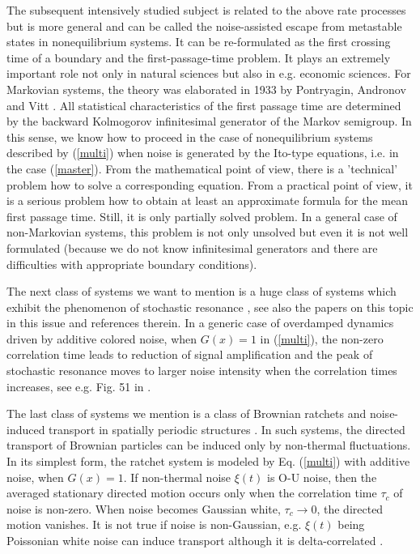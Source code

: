 \documentclass[authoryear,draft,1p,times]{elsarticle}
\renewcommand{\=}{\stackrel{\mathrm{d}}{=}}
\begin{document}
The subsequent intensively studied subject is related to the above rate 
processes  but is more general and can be called the noise-assisted 
escape from metastable states in nonequilibrium systems. It can be 
re-formulated as the first crossing  time of a boundary and 
 the  first-passage-time problem. It plays an extremely important role not 
only in natural sciences but also in  e.g. economic sciences.
  For Markovian systems, 
the theory was elaborated  in 1933 by Pontryagin, Andronov and 
Vitt \cite{pon}. All statistical characteristics of the first passage 
time are determined by the backward Kolmogorov infinitesimal 
generator of the Markov semigroup. In this sense, we know 
how to proceed in the case of nonequilibrium systems described by 
(\ref{multi}) when noise is generated by the Ito-type equations, 
i.e. in the case (\ref{master}). From the mathematical point of view, 
there is a 'technical' 
problem how to solve a corresponding equation. From a practical point 
of view, it is a serious problem how to obtain at least an
approximate formula for the mean first passage time. 
Still, it is only partially solved problem. 
In a general case of non-Markovian systems, this problem is not only 
unsolved but even it is not well formulated (because we do not know 
infinitesimal generators and there are difficulties with appropriate  
boundary conditions).  
 

The next class of systems we want to mention is 
a huge class of systems which exhibit the phenomenon of 
stochastic resonance \cite{reso}, see also the papers 
on this topic in this issue and references therein. 
 In a generic case of overdamped 
dynamics driven by additive colored noise, when $G(x) =1$ in (\ref{multi}), 
the non-zero correlation time 
leads to reduction of signal amplification and the peak of stochastic 
resonance moves to larger noise intensity when the correlation times 
increases, see e.g. Fig. 51 in \cite{reso}.

The last class of systems we mention is a class of 
Brownian ratchets and noise-induced transport in spatially periodic 
structures \cite{ratch}. In such systems, the directed transport of 
Brownian particles 
can be induced only by non-thermal fluctuations. In its simplest form, 
the ratchet system is modeled by Eq. (\ref{multi}) with additive noise, 
when $G(x) =1$. If non-thermal noise $\xi(t)$ is O-U noise, then 
the averaged stationary directed motion occurs only when the 
correlation time $\tau_c$ of noise is non-zero.  When noise 
becomes Gaussian white, $\tau_c \to 0$, the directed motion vanishes.  
It is not true if noise is non-Gaussian,  e.g. $\xi(t)$ being 
 Poissonian 
white noise can induce transport although it is delta-correlated 
\cite{bart2}.   
\end{document}
